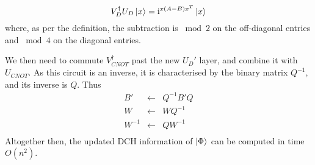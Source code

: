 \[V_{D}^{\dagger}U_{D}\ket{x}=\mathrm{i}^{x \left(A-B\right)x^{T}}\ket{x}\]
where, as per the definition, the subtraction is $\bmod{2}$ on the off-diagonal entries and $\bmod{4}$ on the diagonal entries.\par
We then need to commute $V_{CNOT}^{\dagger}$ past the new $U_{D}'$ layer, and combine it with $U_{CNOT}$. As this circuit is an inverse, it is characterised by the binary matrix $Q^{-1}$, and its inverse is $Q$. Thus
\begin{equation}
\begin{array}{rcl}
B' & \gets & Q^{-1}B'Q \\
W & \gets & WQ^{-1}\\
W^{-1} & \gets & QW^{-1} \\
\end{array}
\end{equation}
Altogether then, the updated DCH information of $\ket{\Phi}$ can be computed in time $O(n^{2})$.\par
